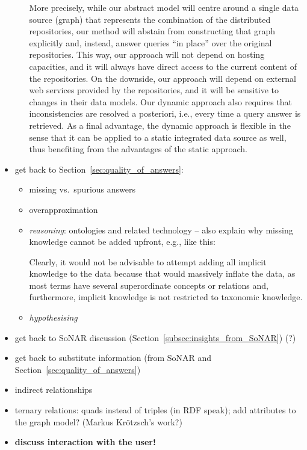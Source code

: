 \begin{itemize}
\begin{itemize}
        More precisely, while our abstract model will centre around a single data source (graph)
        that represents the combination of the distributed repositories,
        our method will abstain from constructing that graph explicitly and, instead,
        answer queries \enquote{in place} over the original repositories.
        This way, our approach will not depend on hosting capacities,
        and it will always have direct access to the current content of the repositories.
        On the downside, our approach will depend on external web services provided by the repositories,
        and it will be sensitive to changes in their data models.
        Our dynamic approach also requires that inconsistencies are resolved
        a posteriori, i.e., every time a query answer is retrieved.
        As a final advantage, the dynamic approach is flexible
        in the sense that it can be applied to a static integrated data source as well,
        thus benefiting from the advantages of the static approach.
  \end{itemize}
  \item
    get back to Section~\ref{sec:quality_of_answers}:
    \begin{itemize}
      \item
        missing vs.\ spurious answers
      \item
        overapproximation
      \item
        \emph{reasoning}: ontologies and related technology -- also explain why
        missing knowledge cannot be added upfront, e.g., like this:
        
        Clearly, it would not be advisable to attempt adding all implicit knowledge to the data
        because that would massively inflate the data,
        as most terms have several superordinate concepts or relations and,
        furthermore, implicit knowledge is not restricted to taxonomic knowledge.
      \item
        \emph{hypothesising}
    \end{itemize}
  \item
    get back to SoNAR discussion (Section~\ref{subsec:insights_from_SoNAR}) (?)
  \item
    get back to substitute information (from SoNAR and Section~\ref{sec:quality_of_answers})
  \item
    indirect relationships
  \item
    ternary relations: quads instead of triples (in \gls{RDF} speak); add attributes to the graph model? (Markus Krötzsch's work?)
  \item
    \textbf{discuss interaction with the user!}
\end{itemize}
